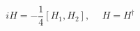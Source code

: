 \begin{equation}
         iH=-\frac{1}{4}[H_1, H_2], \hspace{15pt} H=H^{\dagger}               
\end{equation}

